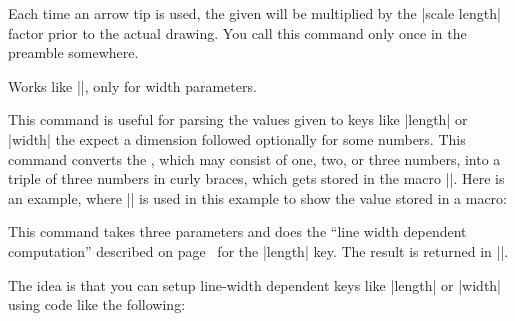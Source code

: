 \begin{command}{\pgfarrowsaddtolengthscalelist{}}
    Each time an arrow tip is used, the given  will be
    multiplied by the |scale length| factor prior to the actual drawing. You
    call this command only once in the preamble somewhere.
\end{command}

\begin{command}{\pgfarrowsaddtowidthscalelist{}}
    Works like |\pgfarrowsaddtolengthscalelist|, only for width parameters.
\end{command}


\begin{command}{\pgfarrowsthreeparameters{}}
    This command is useful for parsing the values given to keys like |length|
    or |width| the expect a dimension followed optionally for some numbers.
    This command converts the ,
    which may consist of one, two, or three numbers, into a triple of three
    numbers in curly braces, which gets stored in the macro
    |\pgfarrowstheparameters|. Here is an example, where |\showvalueofmacro| is
    used in this example to show the value stored in a macro:
\begin{codeexample}
    \makeatletter
    \def\showvalueofmacro#1{%
        \texttt{\expandafter\expandafter\expandafter\expandafter\expandafter\expandafter\expandafter\pgfutil@gobble\expandafter\expandafter\expandafter\string\expandafter\csname#1\endcsname}
    }%
\end{codeexample}
%
\begin{codeexample}[]
\showvalueofmacro\pgfarrowstheparameters
\end{codeexample}
\end{command}

\begin{command}{\pgfarrowslinewidthdependent{}}
    This command takes three parameters and does the ``line width dependent
    computation'' described on page~\pageref{length-arrow-key} for the |length|
    key. The result is returned in |\pgf@x|.

    The idea is that you can setup line-width dependent keys like |length| or
    |width| using code like the following:
\begin{codeexample}[code only]
\pgfkeys{/pgf/arrow keys/depth/.code={%
  \pgfarrowsthreeparameters{#1}%
  \expandafter\pgfarrowsaddtolateoptions\expandafter{%
    \expandafter\pgfarrowslinewidthdependent\pgfarrowstheparameters%
    \pgfarrowdepth\pgf@x%
  }%
}
\end{codeexample}
\end{command}

